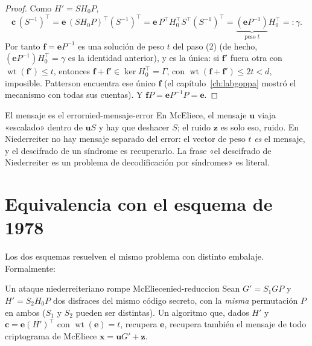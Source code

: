\documentclass[11pt,a4paper,oneside]{report}
\newcommand{\wt}{\operatorname{wt}}
\newcommand{\ve}{\mathbf{e}}
\newcommand{\vx}{\mathbf{x}}
\newcommand{\vc}{\mathbf{c}}
\newcommand{\vu}{\mathbf{u}}
\newcommand{\vz}{\mathbf{z}}
\newcommand{\vf}{\mathbf{f}}
\begin{document}
\begin{proof}
Como $H'=SH_0P$,
\[
  \vc\,(S^{-1})^{\top}
  = \ve\,(SH_0P)^{\top}(S^{-1})^{\top}
  = \ve\,P^{\top}H_0^{\top}S^{\top}(S^{-1})^{\top}
  = \underbrace{(\ve P^{-1})}_{\text{peso }t}H_0^{\top}
  =: \gamma .
\]
Por tanto $\vf=\ve P^{-1}$ es una solución de peso $t$ del paso (2)
(de hecho, $(\ve P^{-1})H_0^{\top}=\gamma$ es la identidad anterior), y
es la única: si $\vf'$ fuera otra con $\wt(\vf')\le t$, entonces
$\vf+\vf'\in\ker H_0^{\top}=\Gamma$, con
$\wt(\vf+\vf')\le2t<d$, imposible. Patterson encuentra ese único $\vf$
(el capítulo~\ref{ch:labgoppa} mostró el mecanismo con todas sus
cuentas). Y $\vf P=\ve P^{-1}P=\ve$.
\end{proof}

\begin{observacion}{El mensaje es el error}{nied-mensaje-error}
En McEliece, el mensaje $\vu$ viaja «escalado» dentro de $\vu S$ y hay
que deshacer $S$; el ruido $\vz$ es solo eso, ruido. En Niederreiter no
hay mensaje separado del error: el vector de peso $t$ \emph{es} el
mensaje, y el descifrado de un síndrome es recuperarlo. La frase «el
descifrado de Niederreiter es un problema de decodificación por
síndromes» es literal.
\end{observacion}

\section{Equivalencia con el esquema de 1978}

Los dos esquemas resuelven el mismo problema con distinto embalaje.
Formalmente:

\begin{proposicion}{Un ataque niederreiteriano rompe McEliece}{nied-reduccion}
Sean $G'=S_1GP$ y $H'=S_2H_0P$ dos disfraces del mismo código secreto,
con la \emph{misma} permutación $P$ en ambos ($S_1$ y $S_2$ pueden ser
distintas). Un algoritmo que, dados $H'$ y $\vc=\ve(H')^{\top}$ con
$\wt(\ve)=t$, recupera $\ve$, recupera también el mensaje de todo
criptograma de McEliece $\vx=\vu G'+\vz$.
\end{proposicion}
\end{document}
